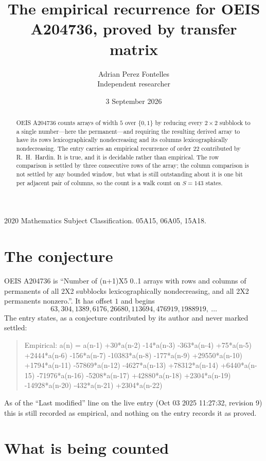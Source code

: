 \documentclass[11pt,a4paper]{article}
\title{The empirical recurrence for OEIS A204736, proved by transfer matrix}
\author{Adrian Perez Fontelles\\ \small Independent researcher}
\date{3 September 2026}
\theoremstyle{plain}
\theoremstyle{definition}
\begin{document}
\maketitle

\begin{abstract}
OEIS A204736 counts arrays of width $5$ over $\{0,1\}$ by reducing every $2\times2$ subblock to a
single number---here the permanent---and requiring the resulting derived array to have its rows
lexicographically nondecreasing and its columns lexicographically nondecreasing. The entry carries an
empirical recurrence of order $22$ contributed by R.~H.~Hardin. It is true, and it is
decidable rather than empirical. The row comparison is settled by three consecutive rows of the
array; the column comparison is not settled by any bounded window, but what is still outstanding
about it is one bit per adjacent pair of columns, so the count is a walk count on $S=143$
states.
\end{abstract}

\noindent\small 2020 Mathematics Subject Classification. 05A15, 06A05, 15A18.\normalsize

\section{The conjecture}

OEIS A204736 is ``Number of (n+1)X5 0..1 arrays with rows and columns of permanents of all 2X2 subblocks lexicographically nondecreasing, and all 2X2 permanents nonzero.''. It has offset $1$ and begins
\[
63, 304, 1389, 6176, 26680, 113694, 476919, 1988919,\ \dots
\]
The entry states, as a conjecture contributed by its author and never marked settled:
\begin{quote}
Empirical: a(n) = a(n-1) +30*a(n-2) -14*a(n-3) -363*a(n-4) +75*a(n-5) +2444*a(n-6) -156*a(n-7) -10383*a(n-8) -177*a(n-9) +29550*a(n-10) +1794*a(n-11) -57869*a(n-12) -4627*a(n-13) +78312*a(n-14) +6440*a(n-15) -71976*a(n-16) -5208*a(n-17) +42880*a(n-18) +2304*a(n-19) -14928*a(n-20) -432*a(n-21) +2304*a(n-22)
\end{quote}
As of the ``Last modified'' line on the live entry (Oct 03 2025 11:27:32, revision 9) this is still
recorded as empirical, and nothing on the entry records it as proved.

\section{What is being counted}
\end{document}
